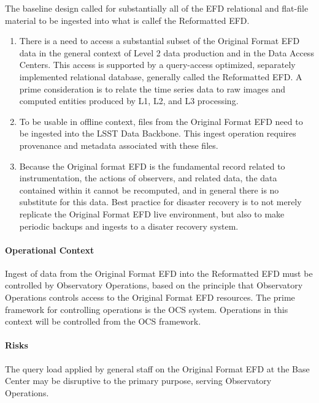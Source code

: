 The baseline design called for substantially all of the EFD relational
and flat-file material to be ingested into what is callef the Reformatted
EFD.

\begin{enumerate}

\item There is a need to access a substantial subset of the Original Format
EFD data in the general context of Level 2 data production and in the
Data Access Centers. This access is supported by a query-access
optimized, separately implemented relational database, generally
called the Reformatted EFD. A prime consideration is to relate the
time series data to raw images and computed entities produced by L1,
L2, and L3 processing.

\item To be usable in offline context, files from the Original Format EFD
need to be ingested into the LSST Data Backbone. This ingest operation
requires provenance and metadata associated with these files.

\item Because the Original format EFD is the fundamental record related to
instrumentation, the actions of observers, and related data, the data
contained within it cannot be recomputed, and in general there is no
substitute for this data. Best practice for disaster recovery is to
not merely replicate the Original Format EFD live environment, but also
to make periodic backups and ingests to a disater recovery system.

\end{enumerate}

\paragraph{Operational Context}

Ingest of data from the Original Format EFD into the Reformatted EFD
must be controlled by Observatory Operations, based on the principle
that Observatory Operations controls access to the Original Format EFD
resources. The prime framework for controlling operations is the OCS
system. Operations in this context will be controlled from the OCS
framework.

\paragraph{Risks} 

The query load applied by general staff on the Original Format
EFD at the Base Center may be disruptive to the primary purpose,
serving Observatory Operations.

